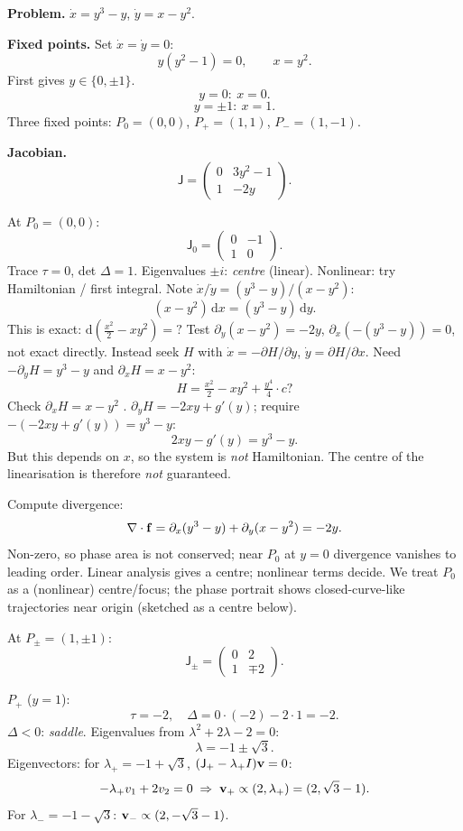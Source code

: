 \documentclass[11pt]{article}
\newcommand{\de}{\mathrm{d}}
\begin{document}
\textbf{Problem.} $\dot x = y^3 - y$, $\dot y = x - y^2$.

\textbf{Fixed points.} Set $\dot x=\dot y=0$:
\[ y(y^2-1) = 0,\qquad x = y^2. \]
First gives $y \in \{0,\pm 1\}$.
\[ y=0:\ x=0. \]
\[ y=\pm 1:\ x=1. \]
Three fixed points: $P_0=(0,0)$, $P_+=(1,1)$, $P_-=(1,-1)$.

\textbf{Jacobian.}
\[ \mathsf J = \begin{pmatrix} 0 & 3y^2-1 \\ 1 & -2y \end{pmatrix}. \]

At $P_0=(0,0)$:
\[ \mathsf J_0 = \begin{pmatrix} 0 & -1 \\ 1 & 0 \end{pmatrix}. \]
Trace $\tau=0$, det $\Delta = 1$. Eigenvalues $\pm i$: \emph{centre} (linear). Nonlinear: try Hamiltonian / first integral. Note $\dot x/\dot y = (y^3-y)/(x-y^2)$:
\[ (x-y^2)\,\de x = (y^3-y)\,\de y. \]
This is exact: $\de(\tfrac{x^2}{2} - x y^2) = ?$ Test $\partial_y(x-y^2) = -2y$, $\partial_x(-(y^3-y)) = 0$, not exact directly. Instead seek $H$ with $\dot x = -\partial H/\partial y$, $\dot y = \partial H/\partial x$. Need $-\partial_y H = y^3-y$ and $\partial_x H = x-y^2$:
\[ H = \tfrac{x^2}{2} - x y^2 + \tfrac{y^4}{4} \cdot c?\]
Check $\partial_x H = x - y^2$ \checkmark. $\partial_y H = -2xy + g'(y)$; require $-(-2xy+g'(y)) = y^3 - y$:
\[ 2xy - g'(y) = y^3 - y. \]
But this depends on $x$, so the system is \emph{not} Hamiltonian. The centre of the linearisation is therefore \emph{not} guaranteed.

Compute divergence:
\[ \nabla\cdot\vb f = \partial_x(y^3-y) + \partial_y(x-y^2) = -2y. \]
Non-zero, so phase area is not conserved; near $P_0$ at $y=0$ divergence vanishes to leading order. Linear analysis gives a centre; nonlinear terms decide. We treat $P_0$ as a (nonlinear) centre/focus; the phase portrait shows closed-curve-like trajectories near origin (sketched as a centre below).

At $P_\pm = (1,\pm 1)$:
\[ \mathsf J_\pm = \begin{pmatrix} 0 & 2 \\ 1 & \mp 2 \end{pmatrix}. \]

$P_+$ ($y=1$):
\[ \tau = -2,\quad \Delta = 0\cdot(-2) - 2\cdot 1 = -2. \]
$\Delta<0$: \emph{saddle}. Eigenvalues from $\lambda^2+2\lambda - 2=0$:
\[ \lambda = -1 \pm \sqrt{3}. \]
Eigenvectors: for $\lambda_+ = -1+\sqrt 3$, $(\mathsf J_+ - \lambda_+ I)\vb v=0$:
\[ -\lambda_+ v_1 + 2 v_2 = 0 \;\Rightarrow\; \vb v_+ \propto (2,\lambda_+) = (2,\sqrt 3-1). \]
For $\lambda_- = -1-\sqrt 3$: $\vb v_- \propto (2,-\sqrt 3-1)$.
\end{document}
